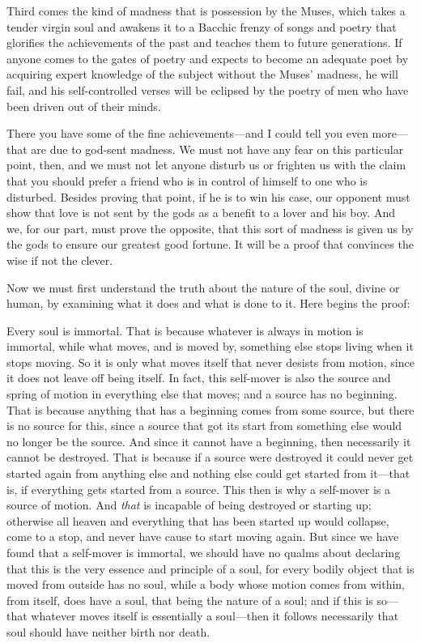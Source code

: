 Third comes the kind of madness that is possession by the Muses, 
which takes a tender virgin soul and awakens it to a
Bacchic frenzy of songs and poetry that glorifies the achievements of
the past and teaches them to future generations. If anyone comes to the
gates of poetry and expects to become an adequate poet by acquiring
expert knowledge of the subject without the Muses’ madness, he will
fail, and his self-controlled verses will be eclipsed by the poetry of
men who have been driven out of their minds.

There you have some of the fine achievements---and I could tell you 
even more---that are due to god-sent madness. We must not have
any fear on this particular point, then, and we must not let anyone
disturb us or frighten us with the claim that you should prefer a friend
who is in control of himself to one who is disturbed. Besides proving
that point, if he is to win his case, our opponent must show that love
is not sent by the gods as a benefit to a lover and his boy. And we, for
our part, must prove the opposite, that this sort of madness is given us
by the gods to ensure our greatest good fortune. It will be a proof that
convinces the wise if not the clever.

Now we must first understand the truth about the nature of the soul,
divine or human, by examining what it does and what is done to it. Here
begins the proof:

Every soul is
immortal. That is because whatever is always in motion is immortal,
while what moves, and is moved by, something else stops living when it
stops moving. So it is only what moves itself that never desists from
motion, since it does not leave off being itself. In fact, this
self-mover is also the source and spring of motion in everything else
that moves; and a source has no beginning. That is because
anything that has a beginning comes from some source, but there is no
source for this, since a source that got its start from something else
would no longer be the source. And since it cannot have a beginning,
then necessarily it cannot be destroyed. That is because if a source
were destroyed it could never get started again from anything else and
nothing else could get started from it---that is, if everything gets
started from a source. This then is why a self-mover is a source of
motion. And {\em that} is incapable of being destroyed or
starting up; otherwise all heaven and everything that has been started
up would collapse,
come to a stop, and never have cause to start moving again. But since we
have found that a self-mover is immortal, we should have no qualms about
declaring that this is the very essence and principle of a soul, for
every bodily object that is moved from outside has no soul, while a body
whose motion comes from within, from itself, does have a soul, that
being the nature of a soul; and if this is so---that whatever moves
itself is essentially a soul---then it follows necessarily that soul
should have neither birth nor death.

